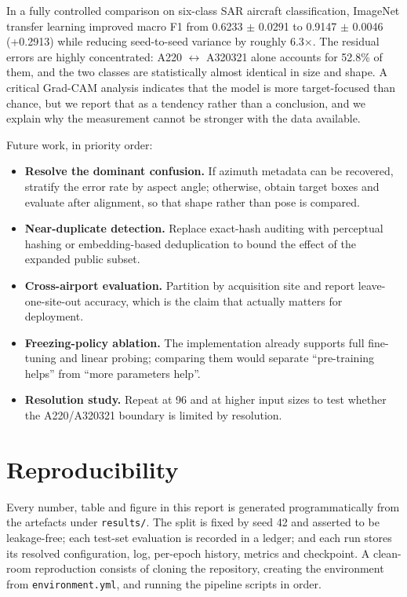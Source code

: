\documentclass[sigconf, screen]{acmart}
\begin{document}
In a fully controlled comparison on six-class SAR aircraft classification,
ImageNet transfer learning improved macro F1 from 0.6233 $\pm$ 0.0291 to 0.9147 $\pm$ 0.0046
(+0.2913) while reducing seed-to-seed variance by roughly 6.3$\times$.
The residual errors are highly concentrated: A220 $\leftrightarrow$ A320321 alone
accounts for 52.8\% of them, and the two classes are statistically
almost identical in size and shape. A critical Grad-CAM analysis indicates that
the model is more target-focused than chance, but we report that as a tendency
rather than a conclusion, and we explain why the measurement cannot be stronger
with the data available.

Future work, in priority order:
\begin{itemize}
\item \textbf{Resolve the dominant confusion.} If azimuth metadata can be
      recovered, stratify the error rate by aspect angle; otherwise, obtain
      target boxes and evaluate after alignment, so that shape rather than
      pose is compared.
\item \textbf{Near-duplicate detection.} Replace exact-hash auditing with
      perceptual hashing or embedding-based deduplication to bound the effect of
      the expanded public subset.
\item \textbf{Cross-airport evaluation.} Partition by acquisition site and report
      leave-one-site-out accuracy, which is the claim that actually matters for
      deployment.
\item \textbf{Freezing-policy ablation.} The implementation already supports
      full fine-tuning and linear probing; comparing them would separate
      ``pre-training helps'' from ``more parameters help''.
\item \textbf{Resolution study.} Repeat at 96 and at higher input sizes to
      test whether the A220/A320321 boundary is limited by resolution.
\end{itemize}

\section*{Reproducibility}
Every number, table and figure in this report is generated programmatically from
the artefacts under \texttt{results/}. The split is fixed by seed 42 and
asserted to be leakage-free; each test-set evaluation is recorded in a ledger; and
each run stores its resolved configuration, log, per-epoch history, metrics and
checkpoint. A clean-room reproduction consists of cloning the repository, creating
the environment from \texttt{environment.yml}, and running the pipeline scripts in
order.



\end{document}
